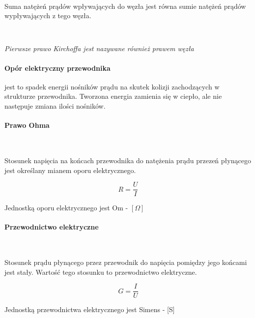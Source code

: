 \documentclass{article}
\begin{document}
            \
            
            Suma natężeń prądów wpływających do węzła jest równa sumie
            natężeń prądów wypływających z tego węzła.
            
            \
            
            \textit{Pierwsze prawo Kirchoffa jest nazywane również prawem węzła}
            \paragraph{Opór elektryczny przewodnika} jest to spadek
            energii nośników prądu na skutek kolizji zachodzących 
            w strukturze przewodnika. Tworzona energia zamienia się
            w ciepło, ale nie następuje zmiana ilości nośników.

            \paragraph{Prawo Ohma}

            \
            
            Stosunek napięcia na końcach przewodnika do natężenia
            prądu przezeń płynącego jest określany mianem oporu
            elektrycznego.

            \begin{equation}
                R = \frac{U}{I}
            \end{equation}

            Jednostką oporu elektrycznego jest Om - $[\Omega]$

            \paragraph{Przewodnictwo elektryczne}

            \
            
            Stosunek prądu płynącego przez przewodnik do napięcia
            pomiędzy jego końcami jest stały. Wartość tego stosunku
            to przewodnictwo elektryczne.

            \begin{equation}
                G = \frac{I}{U}
            \end{equation}

            Jednostką przewodnictwa elektrycznego jest Simens - [S]
\end{document}
